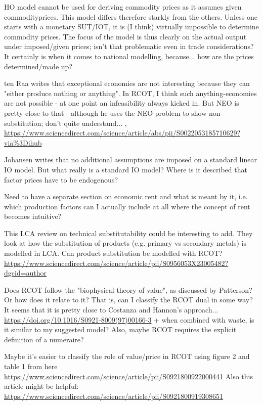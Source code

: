 \documentclass{article}
\begin{document}
\begin{refsection}
HO model cannot be used for deriving commodity prices as it assumes given commodityprices. This model differs therefore starkly from the others. Unless one starts with a monetary SUT/IOT, it is (I think) virtually impossible to determine commodity prices. The focus of the model is thus clearly on the actual output under imposed/given prices; isn't that problematic even in trade considerations? It certainly is when it comes to national modelling, because... how are the prices determined/made up?

ten Raa writes that exceptional economies are not interesting because they can "either produce nothing or anything". In RCOT, I think such anything-economies are not possible - at one point an infeasibility always kicked in. But NEO is pretty close to that - although he uses the NEO problem to show non-substitution; don't quite understand... , \url{https://www.sciencedirect.com/science/article/abs/pii/S0022053185710629?via%3Dihub}

Johansen writes that no additional assumptions are imposed on a standard linear IO model. But what really is a standard IO model? Where is it described that factor prices have to be endogenous?

Need to have a separate section on economic rent and what is meant by it, i.e. which production factors can I actually include at all where the concept of rent becomes intuitive?

This LCA review on technical substitutability could be interesting to add. They look at how the substitution of products (e.g. primary vs secondary metals) is modelled in LCA. Can product substitution be modelled with RCOT? \url{https://www.sciencedirect.com/science/article/pii/S0956053X23005482?dgcid=author}

Does RCOT follow the "biophysical theory of  value", as discussed by Patterson? Or how does it relate to it? That is, can I classify the RCOT dual in some way? It seems that it is pretty close to Costanza and Hannon's approach... \url{https://doi.org/10.1016/S0921-8009(97)00166-3} + when combined with waste, is it similar to my suggested model? Also, maybe RCOT requires the explicit definition of a numeraire?

Maybe it's easier to classify the role of value/price in RCOT using figure 2 and table 1 from here \url{https://www.sciencedirect.com/science/article/pii/S0921800922000441} Also this article might be helpful: \url{https://www.sciencedirect.com/science/article/pii/S0921800919308651}


\end{refsection}
\end{document}
